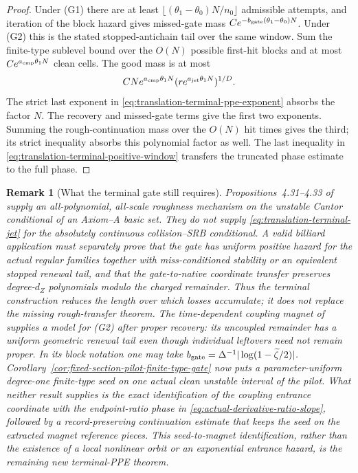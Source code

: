 \documentclass[11pt]{article}
\newtheorem{remark}[theorem]{Remark}
\begin{document}
\begin{proof}
Under \textup{(G1)} there are at least
$\lfloor(\theta_1-\theta_0)N/n_0\rfloor$ admissible attempts, and iteration
of the block hazard gives missed-gate mass
$Ce^{-b_{\rm gate}(\theta_1-\theta_0)N}$.  Under \textup{(G2)} this is the
stated stopped-antichain tail over the same window.  Sum the finite-type sublevel
bound over the $O(N)$ possible first-hit blocks and at most
$Ce^{a_{\rm cmp}\theta_1N}$ clean cells.  The good mass is at most
\[
 CN e^{a_{\rm cmp}\theta_1N}
       (r e^{a_{\rm jet}\theta_1N})^{1/D}.
\]
The strict last exponent in
\eqref{eq:translation-terminal-ppe-exponent} absorbs the factor $N$.
The recovery and missed-gate terms give the first two exponents.  Summing the
rough-continuation mass over the $O(N)$ hit times gives the third; its strict
inequality absorbs this polynomial factor as well.  The last inequality in
\eqref{eq:translation-terminal-positive-window} transfers the truncated
phase estimate to the full phase.
\end{proof}

\begin{remark}[What the terminal gate still requires]
\label{rem:translation-terminal-rough-transfer}
Propositions~4.31--4.33 of \cite{Leclerc2026} supply an all-polynomial,
all-scale roughness mechanism on the unstable Cantor conditional of an
Axiom--A basic set.  They do not supply
\eqref{eq:translation-terminal-jet} for the absolutely continuous
collision--SRB conditional.  A valid billiard application must separately
prove that the gate has uniform positive hazard for the actual regular
families together with miss-conditioned stability or an equivalent stopped
renewal tail, and that the
gate-to-native coordinate transfer preserves degree-$d_Z$ polynomials
modulo the charged remainder.  Thus the terminal construction reduces the
length over which losses accumulate; it does not replace the missing
rough-transfer theorem.
The time-dependent coupling magnet of \cite[Sections~5--7 and
Corollary~34]{SYZ} supplies a model for \textup{(G2)} after proper recovery:
its uncoupled remainder has a uniform geometric renewal tail even though
individual leftovers need not remain proper.  In its block notation one may
take
$b_{\rm gate}=\Delta^{-1}|\log(1-\widetilde\zeta/2)|$.
Corollary~\ref{cor:fixed-section-pilot-finite-type-gate} now puts a
parameter-uniform degree-one finite-type seed on one actual clean
unstable interval of the pilot.  What neither result supplies is the exact
identification of the coupling entrance coordinate with the endpoint-ratio
phase in \eqref{eq:actual-derivative-ratio-slope}, followed by a
record-preserving continuation estimate that keeps the seed on the extracted
magnet reference pieces.  This seed-to-magnet identification, rather than
the existence of a local nonlinear orbit or an exponential entrance hazard,
is the remaining new terminal-PPE theorem.
\end{remark}
\end{document}
